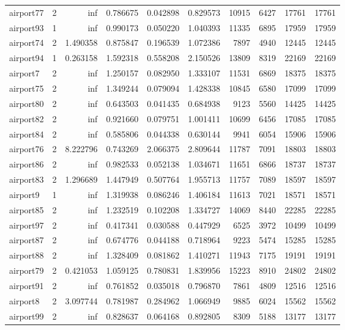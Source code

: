 \begin{longtable}{|l|r|r|r|r|r|r|r|r|r|}
airport77 & 2 & inf & 0.786675 & 0.042898 & 0.829573 & 10915 & 6427 & 17761 & 17761 \\
airport93 & 1 & inf & 0.990173 & 0.050220 & 1.040393 & 11335 & 6895 & 17959 & 17959 \\
airport74 & 2 & 1.490358 & 0.875847 & 0.196539 & 1.072386 & 7897 & 4940 & 12445 & 12445 \\
airport94 & 1 & 0.263158 & 1.592318 & 0.558208 & 2.150526 & 13809 & 8319 & 22169 & 22169 \\
airport7 & 2 & inf & 1.250157 & 0.082950 & 1.333107 & 11531 & 6869 & 18375 & 18375 \\
airport75 & 2 & inf & 1.349244 & 0.079094 & 1.428338 & 10845 & 6580 & 17099 & 17099 \\
airport80 & 2 & inf & 0.643503 & 0.041435 & 0.684938 & 9123 & 5560 & 14425 & 14425 \\
airport82 & 2 & inf & 0.921660 & 0.079751 & 1.001411 & 10699 & 6456 & 17085 & 17085 \\
airport84 & 2 & inf & 0.585806 & 0.044338 & 0.630144 & 9941 & 6054 & 15906 & 15906 \\
airport76 & 2 & 8.222796 & 0.743269 & 2.066375 & 2.809644 & 11787 & 7091 & 18803 & 18803 \\
airport86 & 2 & inf & 0.982533 & 0.052138 & 1.034671 & 11651 & 6866 & 18737 & 18737 \\
airport83 & 2 & 1.296689 & 1.447949 & 0.507764 & 1.955713 & 11757 & 7089 & 18597 & 18597 \\
airport9 & 1 & inf & 1.319938 & 0.086246 & 1.406184 & 11613 & 7021 & 18571 & 18571 \\
airport85 & 2 & inf & 1.232519 & 0.102208 & 1.334727 & 14069 & 8440 & 22285 & 22285 \\
airport97 & 2 & inf & 0.417341 & 0.030588 & 0.447929 & 6525 & 3972 & 10499 & 10499 \\
airport87 & 2 & inf & 0.674776 & 0.044188 & 0.718964 & 9223 & 5474 & 15285 & 15285 \\
airport88 & 2 & inf & 1.328409 & 0.081862 & 1.410271 & 11943 & 7175 & 19191 & 19191 \\
airport79 & 2 & 0.421053 & 1.059125 & 0.780831 & 1.839956 & 15223 & 8910 & 24802 & 24802 \\
airport91 & 2 & inf & 0.761852 & 0.035018 & 0.796870 & 7861 & 4809 & 12516 & 12516 \\
airport8 & 2 & 3.097744 & 0.781987 & 0.284962 & 1.066949 & 9885 & 6024 & 15562 & 15562 \\
airport99 & 2 & inf & 0.828637 & 0.064168 & 0.892805 & 8309 & 5188 & 13177 & 13177 \\

\end{longtable}
